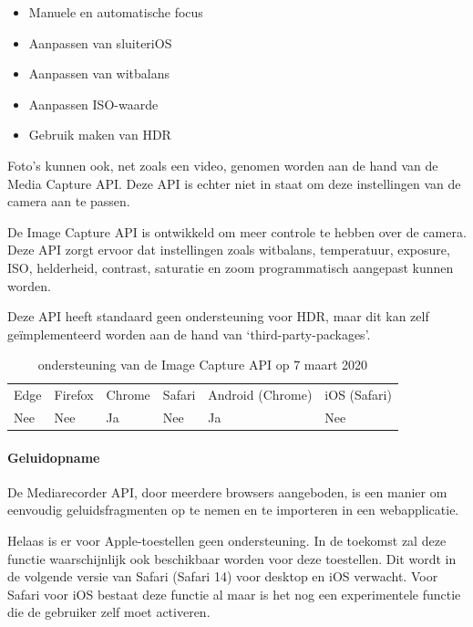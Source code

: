 	 \begin{itemize}
	     \item Manuele en automatische focus
	     \item Aanpassen van sluiteriOS
	     \item Aanpassen van witbalans
	     \item Aanpassen ISO-waarde
	     \item Gebruik maken van HDR 
	   \end{itemize}
	
	Foto's kunnen ook, net zoals een video, genomen worden aan de hand van de Media Capture API. Deze API is echter niet in staat om deze instellingen van de camera aan te passen.
	
	De Image Capture API \autocite{Mandyam2017} is ontwikkeld om meer controle te hebben over de camera. Deze API zorgt ervoor dat instellingen zoals witbalans, temperatuur, exposure, ISO, helderheid, contrast, saturatie en zoom programmatisch aangepast kunnen worden.
	
	Deze API heeft standaard geen ondersteuning voor HDR, maar dit kan zelf geïmplementeerd worden aan de hand van ‘third-party-packages’.
	\autocite{Bhaumik2019}
	
	\begin{table}[H]
		\centering
		\begin{tabular}{llllll}
			Edge & Firefox & Chrome & Safari & Android (Chrome) & iOS (Safari) \\
			Nee   & Nee      & Ja     & Nee     & Ja               & Nee          
		\end{tabular}	
		\caption{ondersteuning van de Image Capture API op 7 maart 2020}
	\end{table}
	
	
	
	\paragraph{Geluidopname }
	De Mediarecorder API, \autocite{CasasSanchez2017} door meerdere browsers aangeboden, is een manier om eenvoudig geluidsfragmenten op te nemen en te importeren in een webapplicatie.
	
	Helaas is er voor Apple-toestellen geen ondersteuning. In de toekomst zal deze functie waarschijnlijk ook beschikbaar worden voor deze toestellen. Dit wordt in de volgende versie van Safari (Safari 14) voor desktop en iOS verwacht. Voor Safari voor iOS bestaat deze functie al maar is het nog een experimentele functie die de gebruiker zelf moet activeren.
	
